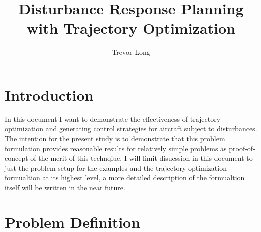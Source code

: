 \documentclass{article}
\title{Disturbance Response Planning with Trajectory Optimization}
\author{Trevor Long}
\begin{document}
\maketitle
\section{Introduction}

In this document I want to demonstrate the effectiveness of trajectory optimization and generating control strategies for aircraft subject to disturbances.
The intention for the present study is to demonstrate that this problem formulation provides reasonable results for relatively simple problems as proof-of-concept of the merit of this technqiue.
I will limit disucssion in this document to just the problem setup for the examples and the trajectory optimization formualtion at its highest level, a more detailed description of the formualtion itself will be written in the near future. 


\section{Problem Definition}\label{sec:problem-statement}
\end{document}

